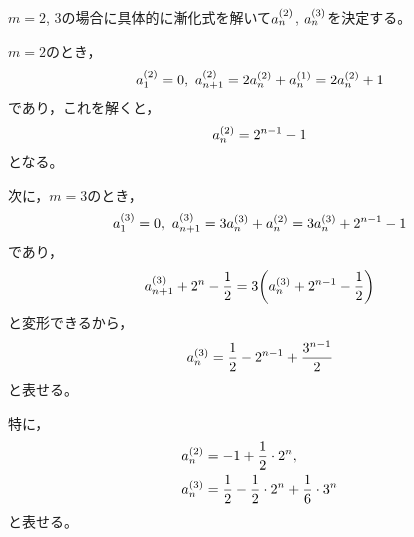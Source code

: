 \documentclass[a4paper,draft]{ltjsarticle}
\begin{document}
\begin{eg}\label{eg:euler-m=2,3}
    $m=2$, $3$の場合に具体的に漸化式を解いて$a_n^{\pare{2}}$, $a_{n}^{\pare{3}}$を決定する。

    $m=2$のとき，
    \begin{equation}
        a_1^{\pare{2}}=0,\
        a_{n+1}^{\pare{2}}=2a_n^{\pare{2}}+a_n^{\pare{1}}=2a_n^{\pare{2}}+1
    \end{equation}
    であり，これを解くと，
    \begin{equation}
        a_n^{\pare{2}}=2^{n-1}-1
    \end{equation}
    となる。

    次に，$m=3$のとき，
    \begin{equation}
        a_1^{\pare{3}}=0,\
        a_{n+1}^{\pare{3}}=3a_n^{\pare{3}}+a_n^{\pare{2}}=3a_n^{\pare{3}}+2^{n-1}-1
    \end{equation}
    であり，
    \begin{equation}
        a_{n+1}^{\pare{3}}+2^n-\frac{1}{2}=3\pare{a_n^{\pare{3}}+2^{n-1}-\frac{1}{2}}
    \end{equation}
    と変形できるから，
    \begin{equation}
        a_n^{\pare{3}}=\frac{1}{2}-2^{n-1}+\frac{3^{n-1}}{2}
    \end{equation}
    と表せる。

    特に，
    \begin{align}
        a_n^{\pare{2}}&=-1+\frac{1}{2}\cdot 2^n,
        \\
        a_n^{\pare{3}}&=\frac{1}{2}-\frac{1}{2}\cdot 2^n+\frac{1}{6}\cdot 3^n
    \end{align}
    と表せる。
\end{eg}
\end{document}
